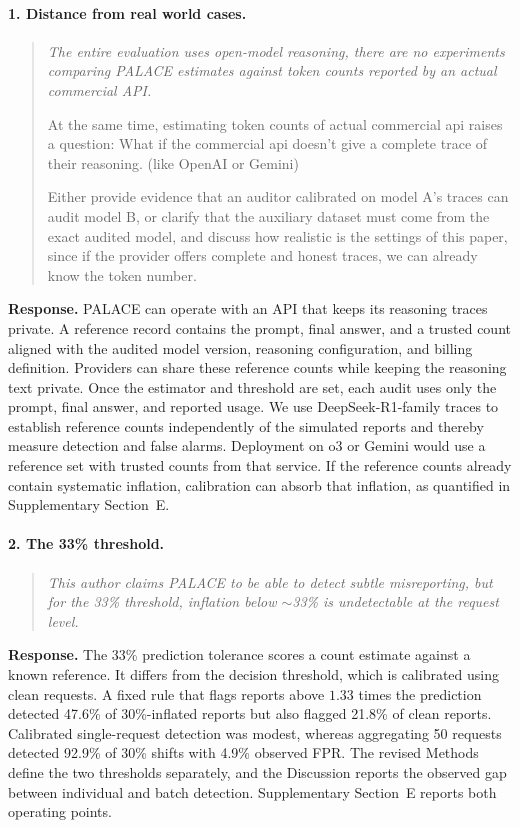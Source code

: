 \documentclass[11pt]{article}
\begin{document}
\paragraph{1. Distance from real world cases.}
\begin{quote}\small\itshape
The entire evaluation uses open-model reasoning, there are no experiments comparing PALACE estimates against token counts reported by an actual commercial API.

At the same time, estimating token counts of actual commercial api raises a question: What if the commercial api doesn't give a complete trace of their reasoning. (like OpenAI or Gemini)

Either provide evidence that an auditor calibrated on model A's traces can audit model B, or clarify that the auxiliary dataset must come from the exact audited model, and discuss how realistic is the settings of this paper, since if the provider offers complete and honest traces, we can already know the token number.
\end{quote}
\textbf{Response.} PALACE can operate with an API that keeps its reasoning traces private. A reference record contains the prompt, final answer, and a trusted count aligned with the audited model version, reasoning configuration, and billing definition. Providers can share these reference counts while keeping the reasoning text private. Once the estimator and threshold are set, each audit uses only the prompt, final answer, and reported usage. We use DeepSeek-R1-family traces to establish reference counts independently of the simulated reports and thereby measure detection and false alarms. Deployment on o3 or Gemini would use a reference set with trusted counts from that service. If the reference counts already contain systematic inflation, calibration can absorb that inflation, as quantified in Supplementary Section~E.

\paragraph{2. The 33\% threshold.}
\begin{quote}\small\itshape
This author claims PALACE to be able to detect \emph{subtle} misreporting, but for the 33\% threshold, inflation below \(\sim\)33\% is undetectable at the request level.
\end{quote}
\textbf{Response.} The 33\% prediction tolerance scores a count estimate against a known reference. It differs from the decision threshold, which is calibrated using clean requests. A fixed rule that flags reports above \(1.33\) times the prediction detected 47.6\% of 30\%-inflated reports but also flagged 21.8\% of clean reports. Calibrated single-request detection was modest, whereas aggregating 50 requests detected 92.9\% of 30\% shifts with 4.9\% observed FPR. The revised Methods define the two thresholds separately, and the Discussion reports the observed gap between individual and batch detection. Supplementary Section~E reports both operating points.
\end{document}

